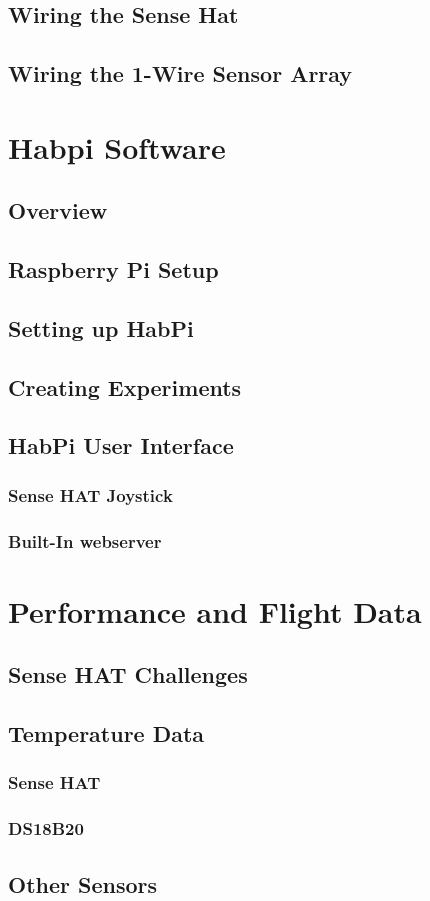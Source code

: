 \documentclass[journal]{new-aiaa}
\begin{document}
\subsection{Wiring the Sense Hat}
\subsection{Wiring the 1-Wire Sensor Array}

\section{Habpi Software}
\subsection{Overview}
\subsection{Raspberry Pi Setup}
\subsection{Setting up HabPi}
\subsection{Creating Experiments}
\subsection{HabPi User Interface}
\subsubsection{Sense HAT Joystick}
\subsubsection{Built-In webserver}

\section{Performance and Flight Data}
\subsection{Sense HAT Challenges}
\subsection{Temperature Data}
\subsubsection{Sense HAT}
\subsubsection{DS18B20}
\subsection{Other Sensors}
\end{document}

